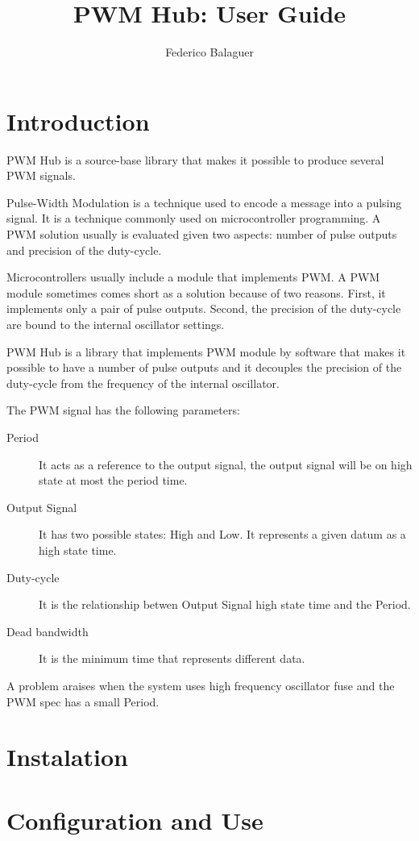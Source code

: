 \documentclass[a4paper,10pt]{report}
\title{PWM Hub: User Guide}
\author{Federico Balaguer}
\begin{document}
\maketitle

\section{Introduction}
PWM Hub is a source-base library that makes it possible to produce several PWM signals. 

Pulse-Width Modulation is a technique used to encode a message into a pulsing signal. It is a technique commonly used on microcontroller programming. A PWM solution usually is evaluated given two aspects: number of pulse outputs and precision of the duty-cycle. 

Microcontrollers usually include a module that implements PWM. A PWM module sometimes comes short as a solution because of two reasons. First, it implements only a pair of pulse outputs. Second, the precision of the duty-cycle are bound to the internal oscillator settings.

PWM Hub is a library that implements PWM module by software that makes it possible to have a number of pulse outputs and it decouples the precision of the duty-cycle from the frequency of the internal oscillator.

The PWM signal has the following parameters:
\begin{description}
  \item[Period] It acts as a reference to the output signal, the output signal will be on high state at most the period time.     
  \item[Output Signal] It has two possible states: High and Low. It represents a given datum as a high state time. 
  \item[Duty-cycle] It is the relationship betwen Output Signal high state time and the Period.
  \item[Dead bandwidth] It is the minimum time that represents different data.
\end{description}

A problem araises when the system uses high frequency oscillator fuse and the PWM spec has a small Period.   


\section{Instalation}

\section{Configuration and Use}
\end{document}
